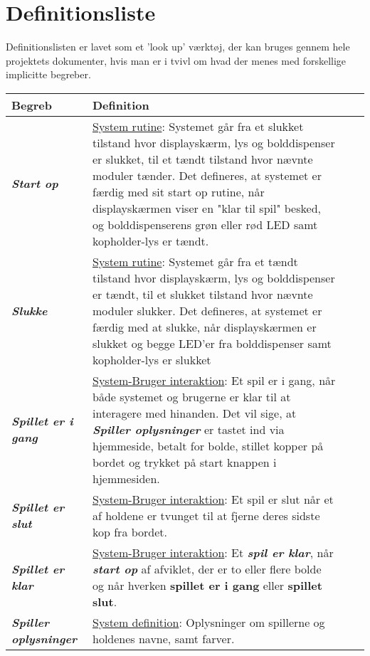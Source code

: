 \documentclass[Kravspecifikation/Kravspec_Main.tex]{subfiles}
\begin{document}
\section{Definitionsliste}
Definitionslisten er lavet som et 'look up' værktøj, der kan bruges gennem hele projektets dokumenter, hvis man er i tvivl om hvad der menes med forskellige implicitte begreber.
\begin{longtable}{|>{\centering\arraybackslash}m{3cm}|>{\RaggedRight\arraybackslash}m{10cm}| p{} | p{}|} 
\hline
        \large{Begreb} & \large{Definition}\\
        \hline
        \textit{\textbf{Start op}} & \underline{System rutine}:
        Systemet går fra et slukket tilstand hvor displayskærm, lys og bolddispenser er slukket, til et tændt tilstand hvor nævnte moduler tænder. Det defineres, at systemet er færdig med sit start op rutine, når displayskærmen viser en "klar til spil" besked, og bolddispenserens grøn eller rød LED samt kopholder-lys er tændt.\\
        \hline
        \textit{\textbf{Slukke}} & \underline{System rutine}:
        Systemet går fra et tændt tilstand hvor displayskærm, lys og bolddispenser er tændt, til et slukket tilstand hvor nævnte moduler slukker. Det defineres, at systemet er færdig med at slukke, når displayskærmen er slukket og begge LED'er fra bolddispenser samt kopholder-lys er slukket\\
        \hline
        \textit{\textbf{Spillet er i gang}} & \underline{System-Bruger interaktion}:
        Et spil er i gang, når både systemet og brugerne er klar til at interagere med hinanden. Det vil sige, at \textit{\textbf{Spiller oplysninger}} er tastet ind via hjemmeside, betalt for bolde, stillet kopper på bordet og trykket på start knappen i hjemmesiden.\\
        \hline
        \textit{\textbf{Spillet er slut}} & \underline{System-Bruger interaktion}:
        Et spil er slut når et af holdene er tvunget til at fjerne deres sidste kop fra bordet.\\        
        \hline
        \textit{\textbf{Spillet er klar}} & \underline{System-Bruger interaktion}:
        Et \textbf{\textit{spil er klar}}, når \textbf{\textit{start op}} af afviklet, der er to eller flere bolde og når hverken \textbf{spillet er i gang} eller \textbf{spillet slut}.\\
        \hline
        \textit{\textbf{Spiller oplysninger}} & \underline{System definition}:
        Oplysninger om spillerne og holdenes navne, samt farver.\\

\end{longtable}
\end{document}
